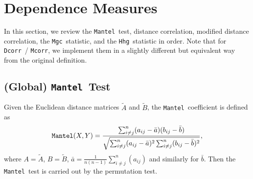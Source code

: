 \documentclass[11pt]{article}
\providecommand{\sct}[1]{{\sc \texttt{#1}}}
\newcommand{\subfigimg}[3][,]{%
  \setbox1=\hbox{\texttt{[image: \#3]}}%
  \leavevmode\rlap{\usebox1}%
  \rlap{\hspace*{12pt}\raisebox{\dimexpr\ht1-0\baselineskip}{#2}}%
  \phantom{\usebox1}%
}
\newcommand{\Mgc}{\sct{Mgc}}
\newcommand{\Hhg}{\sct{Hhg}}
\newcommand{\Dcorr}{\sct{Dcorr}}
\newcommand{\Mcorr}{\sct{Mcorr}}
\newcommand{\Mantel}{\sct{Mantel}}
\begin{document}

\section{Dependence Measures}
\label{appen:methods}

In this section, we review the \Mantel~test, distance correlation, modified distance correlation, the \Mgc~statistic, and the \Hhg~statistic in order. Note that for \Dcorr~/ \Mcorr, we implement them in a slightly different but equivalent way from the original definition.

\subsection{(Global) \Mantel~Test}
\label{appen:mantel}
Given the Euclidean distance matrices $\tilde{A}$ and $\tilde{B}$, the \Mantel~coefficient \cite{Mantel1967} is defined as
\begin{equation}
\Mantel(X,Y)=\frac{\sum_{i \neq j}^{n}(a_{ij}-\bar{a})(b_{ij}-\bar{b})}{\sqrt{\sum_{i \neq j}^{n}(a_{ij}-\bar{a})^2 \sum_{i \neq j}^{n}(b_{ij}-\bar{b})^2}},
\end{equation}
where $A=\tilde{A}$, $B=\tilde{B}$, $\bar{a}=\frac{1}{n(n-1)}\sum_{i \neq j}^{n}(a_{ij})$ and similarly for $\bar{b}$. Then the \Mantel~test is carried out by the permutation test.
\end{document}
